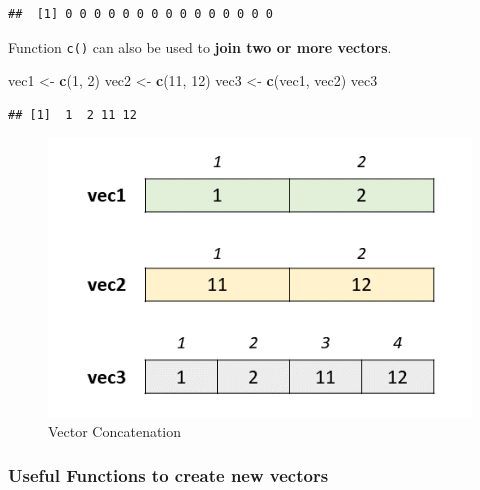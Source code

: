 \documentclass[
]{book}
\newenvironment{Shaded}{\begin{snugshade}}{\end{snugshade}}
\newcommand{\DecValTok}[1]{\textcolor[rgb]{0.00,0.00,0.81}{#1}}
\newcommand{\FunctionTok}[1]{\textcolor[rgb]{0.13,0.29,0.53}{\textbf{#1}}}
\newcommand{\NormalTok}[1]{#1}
\newcommand{\OtherTok}[1]{\textcolor[rgb]{0.56,0.35,0.01}{#1}}
\begin{document}
\begin{verbatim}
##  [1] 0 0 0 0 0 0 0 0 0 0 0 0 0 0 0
\end{verbatim}

Function \texttt{c()} can also be used to \textbf{join two or more vectors}.

\begin{Shaded}
\begin{Highlighting}[]
\NormalTok{vec1 }\OtherTok{\textless{}{-}} \FunctionTok{c}\NormalTok{(}\DecValTok{1}\NormalTok{, }\DecValTok{2}\NormalTok{)}
\NormalTok{vec2 }\OtherTok{\textless{}{-}} \FunctionTok{c}\NormalTok{(}\DecValTok{11}\NormalTok{, }\DecValTok{12}\NormalTok{)}
\NormalTok{vec3 }\OtherTok{\textless{}{-}} \FunctionTok{c}\NormalTok{(vec1, vec2)}
\NormalTok{vec3}
\end{Highlighting}
\end{Shaded}

\begin{verbatim}
## [1]  1  2 11 12
\end{verbatim}

\begin{figure}

{\centering \includegraphics[width=6.86in,height=0.2\textheight]{images/vector_concatenation} 

}

\caption{Vector Concatenation}\label{fig:vecconcat}
\end{figure}

\hypertarget{useful-functions-to-create-new-vectors}{%
\subsubsection*{Useful Functions to create new vectors}\label{useful-functions-to-create-new-vectors}}
\end{document}
